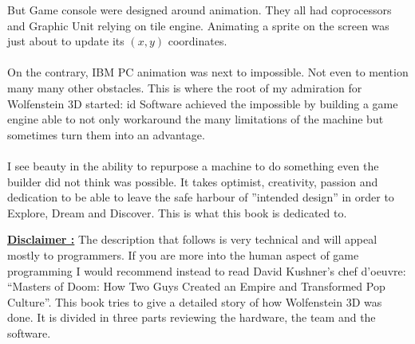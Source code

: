 But Game console were designed around animation. They all had coprocessors and Graphic Unit relying on tile engine. Animating a sprite on the screen was just about to update its $(x,y)$ coordinates.\\
\\
On the contrary, IBM PC animation was next to impossible. Not even to mention many many other obstacles. This is where the root of my admiration for Wolfenstein 3D started: id Software achieved the impossible by building a game engine able to not only workaround the many limitations of the machine but sometimes turn them into an advantage.\\
\\
I see beauty in the ability to repurpose a machine to do something even the builder did not think was possible. It takes optimist, creativity, passion and dedication to be able to leave the safe harbour of ''intended design'' in order to Explore, Dream and Discover. This is what this book is dedicated to.\\
\bigskip

 \textbf{\underline{Disclaimer :}} The description that follows is very technical and will appeal mostly to programmers. If you are more into the human aspect of game programming I would recommend instead to read David Kushner’s chef d’oeuvre: “Masters of Doom: How Two Guys Created an Empire and Transformed Pop Culture”.
This book tries to give a detailed story of how Wolfenstein 3D was done. It is divided in three parts reviewing the hardware, the team and the software.